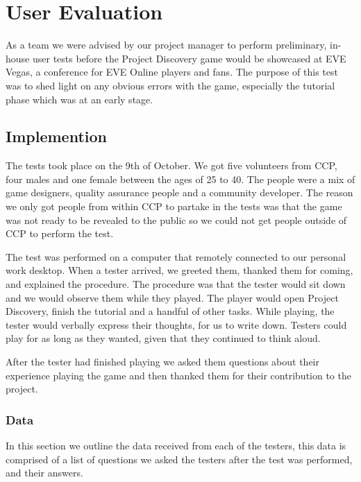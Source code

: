 \section{User Evaluation}\label{sec:userevaluation}

As a team we were advised by our project manager to perform preliminary, in-house user tests before the Project Discovery game would be showcased at EVE Vegas, a conference for EVE Online players and fans. The purpose of this test was to shed light on any obvious errors with the game, especially the tutorial phase which was at an early stage.

\subsection{Implemention}
The tests took place on the 9th of October. We got five volunteers from CCP, four males and one female between the ages of 25 to 40. The people were a mix of game designers, quality assurance people and a community developer. The reason we only got people from within CCP to partake in the tests was that the game was not ready to be revealed to the public so we could not get people outside of CCP to perform the test.

The test was performed on a computer that remotely connected to our personal work desktop. When a tester arrived, we greeted them, thanked them for coming, and explained the procedure. The procedure was that the tester would sit down and we would observe them while they played. The player would open Project Discovery, finish the tutorial and a handful of other tasks. While playing, the tester would verbally express their thoughts, for us to write down. Testers could play for as long as they wanted, given that they continued to think aloud.

After the tester had finished playing we asked them questions about their experience playing the game and then thanked them for their contribution to the project.

\subsubsection{Data}

In this section we outline the data received from each of the testers, this data is comprised of a list of questions we asked the testers after the test was performed, and their answers.

